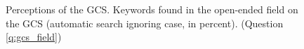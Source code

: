 \documentclass[12pt,english]{article}
\begin{document}
\begin{figure}[h!]
    \caption[Topics of open-ended field on the GCS]{Perceptions of the GCS. Keywords found in the open-ended field on the GCS (automatic search ignoring case, in percent). (Question \ref{q:gcs_field})}\label{fig:gcs_field_contains}
\end{figure}
\end{document}
